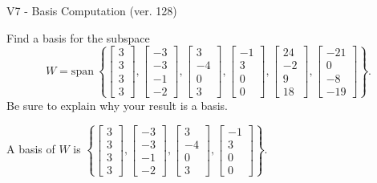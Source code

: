 \begin{exercise}
  \begin{exerciseTitle}V7 - Basis Computation (ver. 128)\end{exerciseTitle}
  \begin{exerciseStatement}
    Find a basis for the subspace 
\[W=\mathrm{span}\ \left\{\left[\begin{array}{r}
3 \\
3 \\
3 \\
3
\end{array}\right] , \left[\begin{array}{r}
-3 \\
-3 \\
-1 \\
-2
\end{array}\right] , \left[\begin{array}{r}
3 \\
-4 \\
0 \\
3
\end{array}\right] , \left[\begin{array}{r}
-1 \\
3 \\
0 \\
0
\end{array}\right] , \left[\begin{array}{r}
24 \\
-2 \\
9 \\
18
\end{array}\right] , \left[\begin{array}{r}
-21 \\
0 \\
-8 \\
-19
\end{array}\right]\right\}.\]
 Be sure to explain why your result is a basis.


  \end{exerciseStatement}
  \begin{exerciseAnswer}
   A basis of \(W\) is  \(\left\{\left[\begin{array}{r}
3 \\
3 \\
3 \\
3
\end{array}\right] , \left[\begin{array}{r}
-3 \\
-3 \\
-1 \\
-2
\end{array}\right] , \left[\begin{array}{r}
3 \\
-4 \\
0 \\
3
\end{array}\right] , \left[\begin{array}{r}
-1 \\
3 \\
0 \\
0
\end{array}\right]\right\}\).
  


  \end{exerciseAnswer}
\end{exercise}